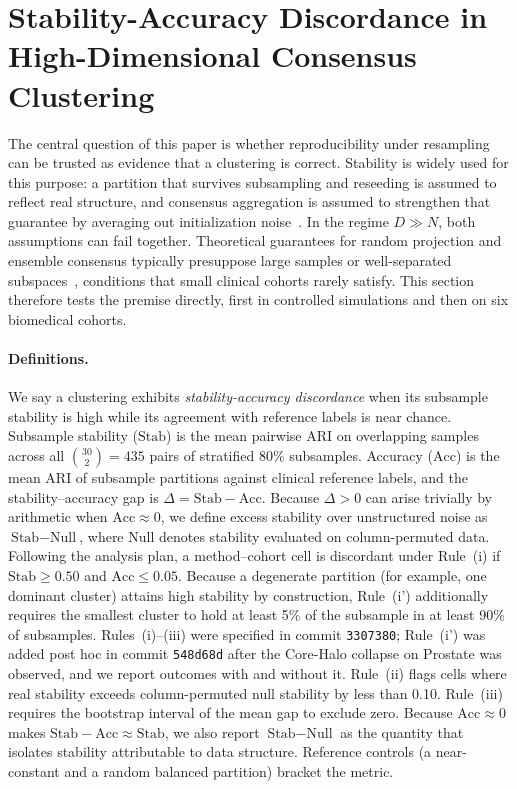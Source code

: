 \documentclass[pdflatex,sn-mathphys-num]{sn-jnl}
\theoremstyle{thmstyleone}
\theoremstyle{thmstyletwo}
\theoremstyle{thmstylethree}
\begin{document}
\section{Stability-Accuracy Discordance in High-Dimensional Consensus Clustering}\label{sec:falsification}

The central question of this paper is whether reproducibility under resampling can be trusted as evidence that a clustering is correct. Stability is widely used for this purpose: a partition that survives subsampling and reseeding is assumed to reflect real structure, and consensus aggregation is assumed to strengthen that guarantee by averaging out initialization noise~\cite{fred2005combining}. In the regime $D \gg N$, both assumptions can fail together. Theoretical guarantees for random projection and ensemble consensus typically presuppose large samples or well-separated subspaces~\cite{zhang2024optimal}, conditions that small clinical cohorts rarely satisfy. This section therefore tests the premise directly, first in controlled simulations and then on six biomedical cohorts.

\paragraph{Definitions.}
We say a clustering exhibits \emph{stability-accuracy discordance} when its subsample stability is high while its agreement with reference labels is near chance. Subsample stability ($\text{Stab}$) is the mean pairwise ARI on overlapping samples across all $\binom{30}{2} = 435$ pairs of stratified 80\% subsamples. Accuracy ($\text{Acc}$) is the mean ARI of subsample partitions against clinical reference labels, and the stability--accuracy gap is $\Delta = \text{Stab} - \text{Acc}$. Because $\Delta > 0$ can arise trivially by arithmetic when $\text{Acc} \approx 0$, we define excess stability over unstructured noise as $\text{Stab} - \text{Null}$, where $\text{Null}$ denotes stability evaluated on column-permuted data. Following the analysis plan, a method--cohort cell is discordant under Rule~(i) if $\text{Stab} \ge 0.50$ and $\text{Acc} \le 0.05$. Because a degenerate partition (for example, one dominant cluster) attains high stability by construction, Rule~(i') additionally requires the smallest cluster to hold at least 5\% of the subsample in at least 90\% of subsamples. Rules~(i)--(iii) were specified in commit \texttt{3307380}; Rule~(i') was added post hoc in commit \texttt{548d68d} after the Core-Halo collapse on Prostate was observed, and we report outcomes with and without it. Rule~(ii) flags cells where real stability exceeds column-permuted null stability by less than 0.10. Rule~(iii) requires the bootstrap interval of the mean gap to exclude zero. Because $\text{Acc} \approx 0$ makes $\text{Stab} - \text{Acc} \approx \text{Stab}$, we also report $\text{Stab} - \text{Null}$ as the quantity that isolates stability attributable to data structure. Reference controls (a near-constant and a random balanced partition) bracket the metric.
\end{document}
